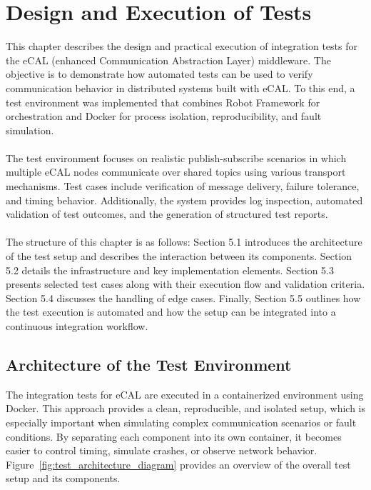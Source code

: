 \clearpage
\section{Design and Execution of Tests}

This chapter describes the design and practical execution of integration tests for the eCAL (enhanced Communication Abstraction Layer) middleware. The objective is to demonstrate how automated tests can be used to verify communication behavior in distributed systems built with eCAL. To this end, a test environment was implemented that combines Robot Framework for orchestration and Docker for process isolation, reproducibility, and fault simulation.
\\
\\
The test environment focuses on realistic publish-subscribe scenarios in which multiple eCAL nodes communicate over shared topics using various transport mechanisms. Test cases include verification of message delivery, failure tolerance, and timing behavior. Additionally, the system provides log inspection, automated validation of test outcomes, and the generation of structured test reports.
\\
\\
The structure of this chapter is as follows: Section 5.1 introduces the architecture of the test setup and describes the interaction between its components. Section 5.2 details the infrastructure and key implementation elements. Section 5.3 presents selected test cases along with their execution flow and validation criteria. Section 5.4 discusses the handling of edge cases. Finally, Section 5.5 outlines how the test execution is automated and how the setup can be integrated into a continuous integration workflow.


\subsection{Architecture of the Test Environment}

The integration tests for eCAL are executed in a containerized environment using Docker. This approach provides a clean, reproducible, and isolated setup, which is especially important when simulating complex communication scenarios or fault conditions. By separating each component into its own container, it becomes easier to control timing, simulate crashes, or observe network behavior. Figure~\ref{fig:test_architecture_diagram} provides an overview of the overall test setup and its components.
 \\
 \\
 
